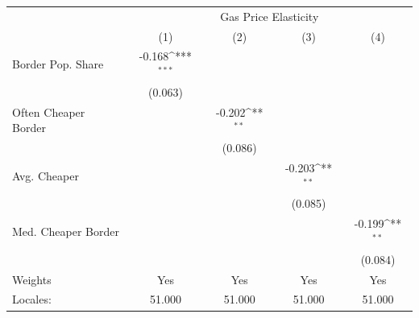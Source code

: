 {
\def\sym#1{\ifmmode^{#1}\else\(^{#1}\)\fi}
\begin{tabular}{l*{4}{c}}
\hline\hline
            &\multicolumn{4}{c}{Gas Price Elasticity}                                               \\
            &\multicolumn{1}{c}{(1)}         &\multicolumn{1}{c}{(2)}         &\multicolumn{1}{c}{(3)}         &\multicolumn{1}{c}{(4)}         \\
\hline
Border Pop. Share&      -0.168\sym{***} &                     &                     &                     \\
            &     (0.063)         &                     &                     &                     \\
[1em]
Often Cheaper Border&                     &      -0.202\sym{**} &                     &                     \\
            &                     &     (0.086)         &                     &                     \\
[1em]
Avg. Cheaper&                     &                     &      -0.203\sym{**} &                     \\
            &                     &                     &     (0.085)         &                     \\
[1em]
Med. Cheaper Border&                     &                     &                     &      -0.199\sym{**} \\
            &                     &                     &                     &     (0.084)         \\
\hline
Weights     &         Yes         &         Yes         &         Yes         &         Yes         \\
Locales:    &      51.000         &      51.000         &      51.000         &      51.000         \\
\hline\hline
\end{tabular}
}
